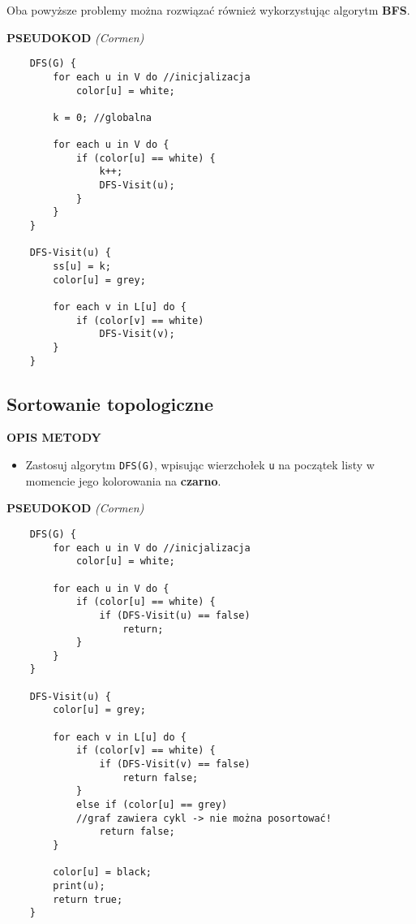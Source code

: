 \documentclass[algorytmy.tex]{subfiles}
\begin{document}
Oba powyższe problemy można rozwiązać również wykorzystując algorytm
\textbf{BFS}.

    \textbf{PSEUDOKOD} \textit{(Cormen)}
    \begin{verbatim}
    DFS(G) {
        for each u in V do //inicjalizacja
            color[u] = white;

        k = 0; //globalna

        for each u in V do {
            if (color[u] == white) {
                k++;
                DFS-Visit(u);
            }
        }
    }

    DFS-Visit(u) {
        ss[u] = k;
        color[u] = grey;

        for each v in L[u] do {
            if (color[v] == white)
                DFS-Visit(v);
        }
    }
    \end{verbatim}

\pagebreak

\subsection{Sortowanie topologiczne}
    \textbf{OPIS METODY}
    \begin{itemize}
        \item Zastosuj algorytm \texttt{DFS(G)}, wpisując wierzchołek \texttt{u}
              na początek listy w momencie jego kolorowania na \textbf{czarno}.
    \end{itemize}

    \textbf{PSEUDOKOD} \textit{(Cormen)}
    \begin{verbatim}
    DFS(G) {
        for each u in V do //inicjalizacja
            color[u] = white;

        for each u in V do {
            if (color[u] == white) {
                if (DFS-Visit(u) == false)
                    return;
            }
        }
    }

    DFS-Visit(u) {
        color[u] = grey;

        for each v in L[u] do {
            if (color[v] == white) {
                if (DFS-Visit(v) == false)
                    return false;
            }
            else if (color[u] == grey)
            //graf zawiera cykl -> nie można posortować!
                return false;
        }

        color[u] = black;
        print(u);
        return true;
    }
    \end{verbatim}
\end{document}
